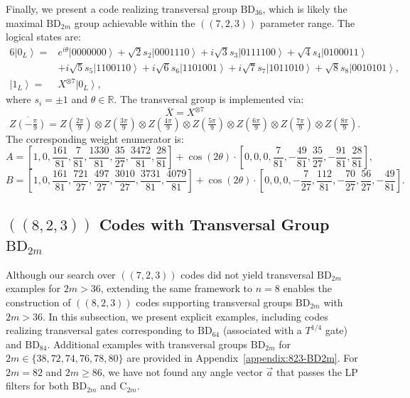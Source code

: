 \documentclass[8pt]{article}
\theoremstyle{definition}
\begin{document}
Finally, we present a code realizing transversal group \(\mathrm{BD}_{36}\), which is likely the maximal \(\mathrm{BD}_{2m}\) group achievable within the \(((7,2,3))\) parameter range. The logical states are:
\begin{align*}
    6\left|0_{L}\right\rangle = & e^{i\theta}\left|0000000\right\rangle +\sqrt{2}s_{2}\left|0001110\right\rangle +i\sqrt{3}s_{3}\left|0111100\right\rangle +\sqrt{4}s_{4}\left|0100011\right\rangle        \\
                                & +i\sqrt{5}s_{5}\left|1100110\right\rangle +i\sqrt{6}s_{6}\left|1101001\right\rangle +i\sqrt{7}s_{7}\left|1011010\right\rangle +\sqrt{8}s_{8}\left|0010101\right\rangle , \\
    \left|1_{L}\right\rangle =  & X^{\otimes7}\left|0_{L}\right\rangle,
\end{align*}
where \(s_i = \pm 1\) and \(\theta \in \mathbb{R}\). The transversal group is implemented via:
\[ \overline{X}=X^{\otimes7} \]
\[ \overline{Z\left(-\tfrac{\pi}{9}\right)}=Z\left(\tfrac{2\pi}{9}\right)\otimes Z\left(\tfrac{3\pi}{9}\right)\otimes Z\left(\tfrac{4\pi}{9}\right)\otimes Z\left(\tfrac{5\pi}{9}\right)\otimes Z\left(\tfrac{6\pi}{9}\right)\otimes Z\left(\tfrac{7\pi}{9}\right)\otimes Z\left(\tfrac{8\pi}{9}\right). \]
The corresponding weight enumerator is:
\[ A=\left[1,0,\frac{161}{81},\frac{7}{81},\frac{1330}{81},\frac{35}{27},\frac{3472}{81},\frac{28}{81}\right]+\cos(2\theta)\cdot\left[0,0,0,\frac{7}{81},-\frac{49}{81},\frac{35}{27},-\frac{91}{81},\frac{28}{81}\right], \]
\[ B=\left[1,0,\frac{161}{81},\frac{721}{27},\frac{497}{27},\frac{3010}{27},\frac{3731}{81},\frac{4079}{81}\right]+\cos(2\theta)\cdot\left[0,0,0,-\frac{7}{27},\frac{112}{81},-\frac{70}{27},\frac{56}{27},-\frac{49}{81}\right].\]

\subsection{\texorpdfstring{$((8,2,3))$}{((8,2,3))} Codes with Transversal Group \texorpdfstring{$\mathrm{BD}_{2m}$}{BD₂ₘ}}

Although our search over \(((7,2,3))\) codes did not yield transversal \(\mathrm{BD}_{2m}\) examples for \(2m > 36\), extending the same framework to \(n=8\) enables the construction of \(((8,2,3))\) codes supporting transversal groups \(\mathrm{BD}_{2m}\) with \(2m>36\). In this subsection, we present explicit examples, including codes realizing transversal gates corresponding to \(\mathrm{BD}_{64}\) (associated with a \(T^{1/4}\) gate) and \(\mathrm{BD}_{84}\). Additional examples with transversal groups \(\mathrm{BD}_{2m}\) for \(2m \in \{38,72,74,76,78,80\}\) are provided in Appendix~\ref{appendix:823-BD2m}.
For \(2m = 82\) and $2m \ge 86$, we have not found any angle vector \(\vec{a}\) that passes the LP filters for both \(\mathrm{BD}_{2m}\) and \(\mathrm{C}_{2m}\).
\end{document}
